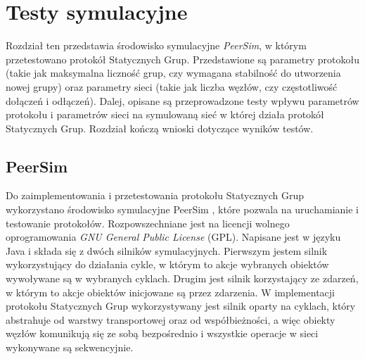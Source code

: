 \documentclass[12pt, twoside, openany]{report}
\begin{document}







\chapter{Testy symulacyjne}

Rozdział ten przedstawia środowisko symulacyjne \textit{PeerSim}, w którym przetestowano protokół Statycznych Grup. Przedstawione są parametry protokołu (takie jak maksymalna liczność grup, czy wymagana stabilność do utworzenia nowej grupy) oraz parametry sieci (takie jak liczba węzłów, czy częstotliwość dołączeń i odłączeń). Dalej, opisane są przeprowadzone testy wpływu parametrów protokołu i parametrów sieci na symulowaną sieć w której działa protokół Statycznych Grup. Rozdział kończą wnioski dotyczące wyników testów.

\section{PeerSim}

Do zaimplementowania i przetestowania protokołu Statycznych Grup wykorzystano środowisko symulacyjne PeerSim \cite{bib:peersim}, które pozwala na uruchamianie i testowanie protokołów. Rozpowszechniane jest na licencji wolnego oprogramowania \textit{GNU General Public License} (GPL). Napisane jest w języku Java i składa się z dwóch silników symulacyjnych. Pierwszym jestem silnik wykorzystujący do działania cykle, w którym to akcje wybranych obiektów wywoływane są w wybranych cyklach. Drugim jest silnik korzystający ze zdarzeń, w którym to akcje obiektów inicjowane są przez zdarzenia. W implementacji protokołu Statycznych Grup wykorzystywany jest silnik oparty na cyklach, który abstrahuje od warstwy transportowej oraz od współbieżności, a więc obiekty węzłów komunikują się ze sobą bezpośrednio i wszystkie operacje w sieci wykonywane są sekwencyjnie.
\end{document}
